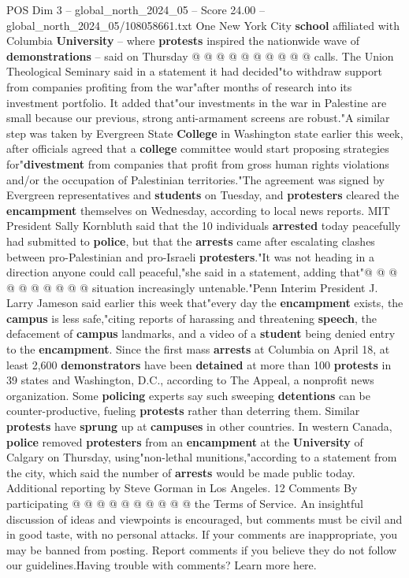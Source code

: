 \begin{textsample}{POS Dim 3 – global\_north\_2024\_05 – Score 24.00 – global\_north\_2024\_05/108058661.txt}
One New York City \textbf{school} affiliated with Columbia \textbf{University} -- where \textbf{protests} inspired the nationwide wave of \textbf{demonstrations} -- said on Thursday @ @ @ @ @ @ @ @ @ @ calls.
The Union Theological Seminary said in a statement it had decided"to withdraw support from companies profiting from the war"after months of research into its investment portfolio.
It added that"our investments in the war in Palestine are small because our previous, strong anti-armament screens are robust."A similar step was taken by Evergreen State \textbf{College} in Washington state earlier this week, after officials agreed that a \textbf{college} committee would start proposing strategies for"\textbf{divestment} from companies that profit from gross human rights violations and/or the occupation of Palestinian territories."The agreement was signed by Evergreen representatives and \textbf{students} on Tuesday, and \textbf{protesters} cleared the \textbf{encampment} themselves on Wednesday, according to local news reports.
MIT President Sally Kornbluth said that the 10 individuals \textbf{arrested} today peacefully had submitted to \textbf{police}, but that the \textbf{arrests} came after escalating clashes between pro-Palestinian and pro-Israeli \textbf{protesters}."It was not heading in a direction anyone could call peaceful,"she said in a statement, adding that"@ @ @ @ @ @ @ @ @ @ situation increasingly untenable."Penn Interim President J.
Larry Jameson said earlier this week that"every day the \textbf{encampment} exists, the \textbf{campus} is less safe,"citing reports of harassing and threatening \textbf{speech}, the defacement of \textbf{campus} landmarks, and a video of a \textbf{student} being denied entry to the \textbf{encampment}.
Since the first mass \textbf{arrests} at Columbia on April 18, at least 2,600 \textbf{demonstrators} have been \textbf{detained} at more than 100 \textbf{protests} in 39 states and Washington, D.C., according to The Appeal, a nonprofit news organization.
Some \textbf{policing} experts say such sweeping \textbf{detentions} can be counter-productive, fueling \textbf{protests} rather than deterring them.
Similar \textbf{protests} have \textbf{sprung} up at \textbf{campuses} in other countries.
In western Canada, \textbf{police} removed \textbf{protesters} from an \textbf{encampment} at the \textbf{University} of Calgary on Thursday, using"non-lethal munitions,"according to a statement from the city, which said the number of \textbf{arrests} would be made public today.
Additional reporting by Steve Gorman in Los Angeles. 12 Comments By participating @ @ @ @ @ @ @ @ @ @ the Terms of Service.
An insightful discussion of ideas and viewpoints is encouraged, but comments must be civil and in good taste, with no personal attacks.
If your comments are inappropriate, you may be banned from posting.
Report comments if you believe they do not follow our guidelines.Having trouble with comments?
Learn more here.

\end{textsample}
